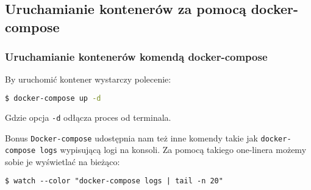 \documentclass[aspectratio=169]{beamer}
\begin{document}
\subsection{Uruchamianie kontenerów za pomocą docker-compose}
\begin{frame}[fragile]
    \frametitle{Uruchamianie kontenerów komendą docker-compose}
    By uruchomić kontener wystarczy polecenie:
    \begin{lstlisting}[frame=single,basicstyle=\footnotesize\ttfamily,language=bash,morekeywords={docker-compose}]
$ docker-compose up -d
    \end{lstlisting}
    Gdzie opcja \texttt{-d} odłącza proces od terminala.
    \pause
    \begin{block}{Bonus}
        \texttt{Docker-compose} udostępnia nam też inne komendy takie jak \texttt{docker-compose logs} wypisującą logi na konsoli. Za pomocą takiego one-linera możemy sobie je wyświetlać na bieżąco:
        \begin{center}\begin{minipage}{0.9\textwidth}
        \begin{lstlisting}[frame=single,basicstyle=\scriptsize\ttfamily,morekeywords={tail,docker-compose,watch}]
$ watch --color "docker-compose logs | tail -n 20"
    \end{lstlisting}
        \end{minipage}\end{center}
    \end{block}
\end{frame}
\end{document}
